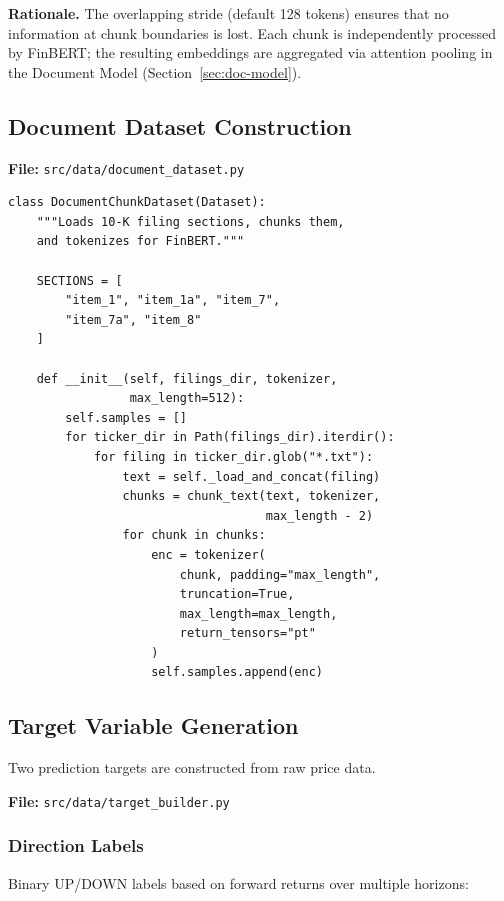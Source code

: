 \documentclass[12pt, a4paper]{article}
\begin{document}
\textbf{Rationale.}  The overlapping stride (default 128 tokens) ensures that no information at chunk boundaries is lost.  Each chunk is independently processed by FinBERT; the resulting embeddings are aggregated via attention pooling in the Document Model (Section~\ref{sec:doc-model}).


\subsection{Document Dataset Construction}
\label{sec:doc-dataset}

\noindent\textbf{File:} \texttt{src/data/document\_dataset.py}

\begin{lstlisting}[caption={DocumentChunkDataset}]
class DocumentChunkDataset(Dataset):
    """Loads 10-K filing sections, chunks them,
    and tokenizes for FinBERT."""
    
    SECTIONS = [
        "item_1", "item_1a", "item_7",
        "item_7a", "item_8"
    ]
    
    def __init__(self, filings_dir, tokenizer,
                 max_length=512):
        self.samples = []
        for ticker_dir in Path(filings_dir).iterdir():
            for filing in ticker_dir.glob("*.txt"):
                text = self._load_and_concat(filing)
                chunks = chunk_text(text, tokenizer,
                                    max_length - 2)
                for chunk in chunks:
                    enc = tokenizer(
                        chunk, padding="max_length",
                        truncation=True,
                        max_length=max_length,
                        return_tensors="pt"
                    )
                    self.samples.append(enc)
\end{lstlisting}


\subsection{Target Variable Generation}
\label{sec:targets}

Two prediction targets are constructed from raw price data.

\noindent\textbf{File:} \texttt{src/data/target\_builder.py}

\subsubsection{Direction Labels}

Binary UP/DOWN labels based on forward returns over multiple horizons:
\end{document}
